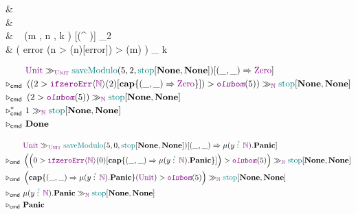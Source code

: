 \begin{codealign}
  &
    \polprd\ \type\ \Unittype\ \where
  \\[-4pt]
  &\quad
    \Unit
  \\
  &
    \
    \saveModulo
    (m \prd \Nat, n \prd \Nat, k \con \Nat)
    [\Unittype \times (\Nat \to^{\polprd} \Nat)]
    \con
    \Unittype
    \coloneq \match_{2}
  \\[-4pt]
  &\quad
    \Unit
    \Rightarrow
    \left(
      \textsf{error}
      \Rightarrow
      (n > \ifzeroErrT\langle \Nat \rangle (n)[\textsf{error}]) > \modulo(m)
    \right)
    \mkCmd_{\Nat}
    k
\end{codealign}

\begin{align*}
  \phantom{\evaluatesto_{\cmd}}
  &
  \Unit
  \mkCmd_{\Unittype}
  \saveModulo(5, 2, \stopNat[\None, \None])
  [(\_, \_) \Rightarrow \Zero]
  \\
  \evaluatesto_{\cmd}\
  &
  \left(
    (2 > \ifzeroErrT\langle \Nat \rangle (2)[\capab\{ (\_, \_) \Rightarrow \Zero \}]) > \modulo(5)
  \right)
  \mkCmd_{\Nat}
  \stopNat[\None, \None]
  \\
  \evaluatesto_{\cmd}\
  &
  \left(
    2 > \modulo(5)
  \right)
  \mkCmd_{\Nat}
  \stopNat[\None, \None]
  \\
  \evaluatesto_{\cmd}^{\ast}\
  &
  1
  \mkCmd_{\Nat}
  \stopNat[\None, \None]
  \\
  \evaluatesto_{\cmd}\
  &
  \Done
\end{align*}

\begin{align*}
  \phantom{\evaluatesto_{\cmd}}
  &
  \Unit
  \mkCmd_{\Unittype}
  \saveModulo(5, 0, \stopNat[\None, \None])
  [(\_, \_) \Rightarrow \muprdabs{y}{\Nat}{\mathbf{Panic}}]
  \\
  \evaluatesto_{\cmd}\
  &
  \left(
    \left(
      0
      >
      \ifzeroErrT\langle \Nat \rangle (0)
      [\capab\{ (\_, \_) \Rightarrow \muprdabs{y}{\Nat}{\mathbf{Panic}} \}]
    \right)
    >
    \modulo(5)
  \right)
  \mkCmd_{\Nat}
  \stopNat[\None, \None]
  \\
  \evaluatesto_{\cmd}\
  &
  \left(
    \capab\{ (\_, \_) \Rightarrow \muprdabs{y}{\Nat}{\mathbf{Panic}} \}(\Unit) > \modulo(5)
  \right)
  \mkCmd_{\Nat}
  \stopNat[\None, \None]
  \\
  \evaluatesto_{\cmd}\
  &
  \muprdabs{y}{\Nat}{\mathbf{Panic}}
  \mkCmd_{\Nat}
  \stopNat[\None, \None]
  \\
  \evaluatesto_{\cmd}\
  &
  \mathbf{Panic}
\end{align*}

